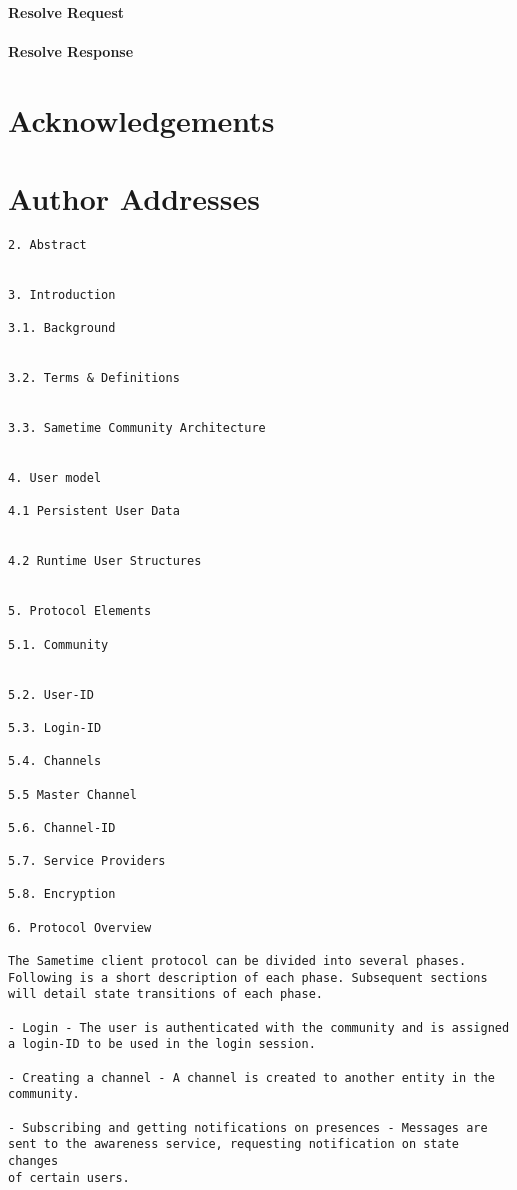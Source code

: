 \documentclass[titlepage,oneside]{book}
\begin{document}
\subsubsection{Resolve Request}
\subsubsection{Resolve Response}

\chapter{Acknowledgements}
\chapter{Author Addresses}


\begin{verbatim}
2. Abstract


3. Introduction

3.1. Background


3.2. Terms & Definitions


3.3. Sametime Community Architecture


4. User model

4.1 Persistent User Data


4.2 Runtime User Structures


5. Protocol Elements

5.1. Community


5.2. User-ID

5.3. Login-ID

5.4. Channels

5.5 Master Channel

5.6. Channel-ID

5.7. Service Providers

5.8. Encryption

6. Protocol Overview

The Sametime client protocol can be divided into several phases.
Following is a short description of each phase. Subsequent sections
will detail state transitions of each phase.

- Login - The user is authenticated with the community and is assigned
a login-ID to be used in the login session.

- Creating a channel - A channel is created to another entity in the
community.

- Subscribing and getting notifications on presences - Messages are
sent to the awareness service, requesting notification on state changes
of certain users.


\end{verbatim}
\end{document}

